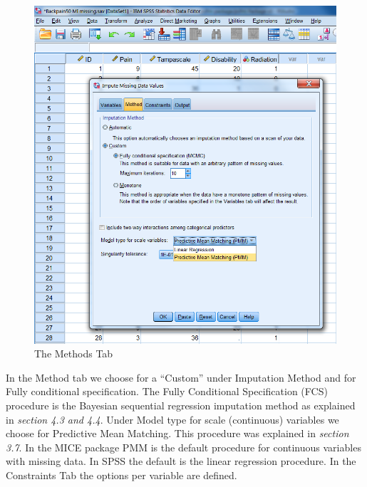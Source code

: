 \documentclass[]{book}
\theoremstyle{definition}
\theoremstyle{definition}
\theoremstyle{definition}
\theoremstyle{remark}
\begin{document}
\begin{figure}

{\centering \includegraphics[width=0.9\linewidth]{images/fig4.7} 

}

\caption{The Methods Tab}\label{fig:fig4-7}
\end{figure}

In the Method tab we choose for a ``Custom'' under Imputation Method and
for Fully conditional specification. The Fully Conditional Specification
(FCS) procedure is the Bayesian sequential regression imputation method
as explained in \emph{section 4.3 and 4.4}. Under Model type for scale
(continuous) variables we choose for Predictive Mean Matching. This
procedure was explained in \emph{section 3.7}. In the MICE package PMM
is the default procedure for continuous variables with missing data. In
SPSS the default is the linear regression procedure. In the Constraints
Tab the options per variable are defined.
\end{document}
